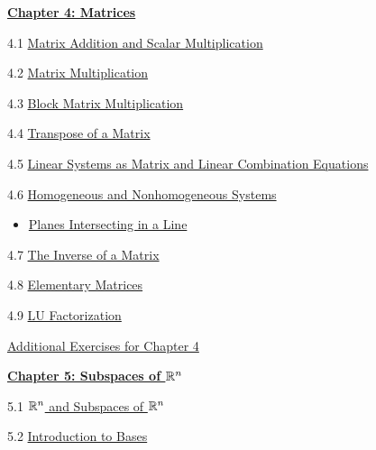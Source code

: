 \documentclass{ximera}
\begin{document}
\href{https://ximera.osu.edu/linearalgebradzv3/LinearAlgebraInteractiveIntro/XLAChapter_matrices/main}{\textbf{Chapter 4: Matrices}}
	
4.1	\href{https://ximera.osu.edu/linearalgebradzv3/LinearAlgebraInteractiveIntro/MAT-0010/main}{Matrix Addition and Scalar Multiplication}
	
4.2	\href{https://ximera.osu.edu/linearalgebradzv3/LinearAlgebraInteractiveIntro/MAT-0020/main}{Matrix Multiplication}
	
4.3	\href{https://ximera.osu.edu/linearalgebradzv3/LinearAlgebraInteractiveIntro/MAT-0023/main}{Block Matrix Multiplication}
	
4.4	\href{https://ximera.osu.edu/linearalgebradzv3/LinearAlgebraInteractiveIntro/MAT-0025/main}{Transpose of a Matrix}
	
4.5	\href{https://ximera.osu.edu/linearalgebradzv3/LinearAlgebraInteractiveIntro/MAT-0030/main}{Linear Systems as Matrix and Linear Combination Equations}
	
4.6	\href{https://ximera.osu.edu/linearalgebradzv3/LinearAlgebraInteractiveIntro/SYS-0050/main}{Homogeneous and Nonhomogeneous Systems}
\begin{itemize}
    \item 
    \href{https://www.geogebra.org/m/gxjnusja}{Planes Intersecting in a Line}
\end{itemize}

4.7	\href{https://ximera.osu.edu/linearalgebradzv3/LinearAlgebraInteractiveIntro/MAT-0050/main}{The Inverse of a Matrix}
	
4.8	\href{https://ximera.osu.edu/linearalgebradzv3/LinearAlgebraInteractiveIntro/MAT-0060/main}{Elementary Matrices}
	
4.9	\href{https://ximera.osu.edu/linearalgebradzv3/LinearAlgebraInteractiveIntro/MAT-0070/main}{LU Factorization}
	
\href{https://ximera.osu.edu/linearalgebradzv3/LinearAlgebraInteractiveIntro/SUPX-0040/main}{Additional Exercises for Chapter 4}
	
\href{https://ximera.osu.edu/linearalgebradzv3/LinearAlgebraInteractiveIntro/XLAChapter_subspacesRn/main}{\textbf{Chapter 5: Subspaces of $\mathbb{R}^n$}}
	
5.1	\href{https://ximera.osu.edu/linearalgebradzv3/LinearAlgebraInteractiveIntro/VSP-0020/main}{$\mathbb{R}^n$ and Subspaces of $\mathbb{R}^n$}
	
5.2	\href{https://ximera.osu.edu/linearalgebradzv3/LinearAlgebraInteractiveIntro/VSP-0030/main}{Introduction to Bases}
	
\end{document}
